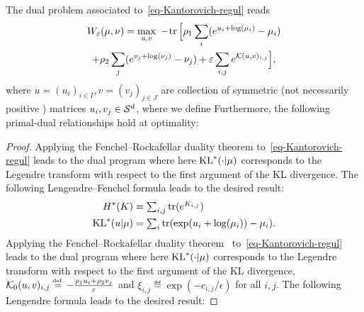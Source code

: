 \begin{prop}
	The dual problem associated to~\eqref{eq-Kantorovich-regul} reads
	\begin{multline}\label{eq-dual-pb}
		W_\varepsilon(\mu,\nu)
		= 
		\underset{u,v}{\max}\; -\!
				\operatorname{tr}\Big[
						\rho_1 \sum_i (e^{u_i+\log(\mu_i)} - \mu_i) \\
					+   \rho_2 \sum_j (e^{v_j+\log(\nu_j)} - \nu_j)
					+    \varepsilon \sum_{i,j}  e^{ \mathcal{K}(u,v)_{i,j} }
			 \Big], 
	\end{multline}	
	where $u=(u_i)_{i \in I}, v=(v_j)_{j \in J}$ are collection of symmetric (not necessarily positive ) matrices $u_i, v_j \in \mathcal{S}^d$, 
	where we define
	Furthermore, the following primal-dual relationships hold at optimality:
\end{prop}
\begin{proof} 
Applying the Fenchel--Rockafellar duality theorem  to~\eqref{eq-Kantorovich-regul} leads to the dual program
where here $\operatorname{KL}^*(\cdot|\mu)$ corresponds to the Legendre transform with respect to the first argument of the KL divergence.
%
The following Lengendre--Fenchel  formula leads to the desired result:
\begin{align*} %
	H^*(K) &= \textstyle\sum_{i,j} \tr( e^{K_{i,j}} ) \\
	\KL^*(u|\mu) &= \textstyle\sum_i \tr( \exp(u_i+\log(\mu_i)) - \mu_i).
\end{align*}
%
\fi
Applying the Fenchel--Rockafellar duality theorem~\cite{rockafellar-convex} to~\eqref{eq-Kantorovich-regul} leads to the dual program
where here $\operatorname{KL}^*(\cdot|\mu)$ corresponds to the Legendre transform with respect to the first argument of the KL divergence, $ \Kern_0(u,v)_{i,j} \eqdef -\frac{\rho_1 u_i + \rho_2 v_j}{\epsilon}$ and $\xi_{i,j} \eqdef \exp(-c_{i,j}/\epsilon)$ for all $i,j$.
%
The following Lengendre formula leads to the desired result:
\end{proof}


